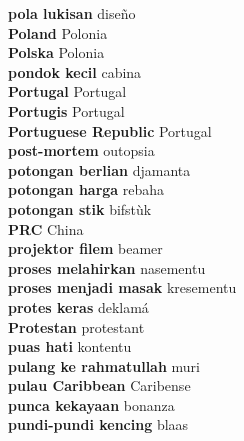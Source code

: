 \textbf{ pola lukisan  } diseño \\
\textbf{ Poland  } Polonia \\
\textbf{ Polska  } Polonia \\
\textbf{ pondok kecil  } cabina \\
\textbf{ Portugal  } Portugal \\
\textbf{ Portugis  } Portugal \\
\textbf{ Portuguese Republic  } Portugal \\
\textbf{ post-mortem  } outopsia \\
\textbf{ potongan berlian  } djamanta \\
\textbf{ potongan harga  } rebaha \\
\textbf{ potongan stik  } bifstùk \\
\textbf{ PRC  } China \\
\textbf{ projektor filem  } beamer \\
\textbf{ proses melahirkan  } nasementu \\
\textbf{ proses menjadi masak  } kresementu \\
\textbf{ protes keras  } deklamá \\
\textbf{ Protestan  } protestant \\
\textbf{ puas hati  } kontentu \\
\textbf{ pulang ke rahmatullah  } muri \\
\textbf{ pulau Caribbean  } Caribense \\
\textbf{ punca kekayaan  } bonanza \\
\textbf{ pundi-pundi kencing  } blaas \\
